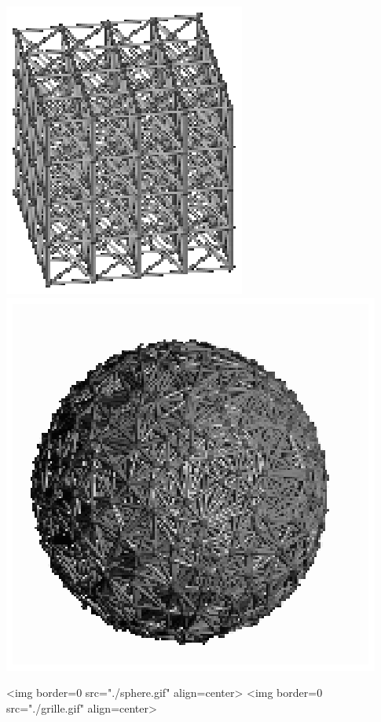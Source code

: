 \begin{ccTexOnly}
\begin{center}
\includegraphics{grille.eps} \hspace*{2cm} 
\includegraphics{sphere.eps} 
\end{center}
\end{ccTexOnly}
\begin{ccHtmlOnly}
<img border=0 src="./sphere.gif" align=center>
<img border=0 src="./grille.gif" align=center>
\end{ccHtmlOnly}

